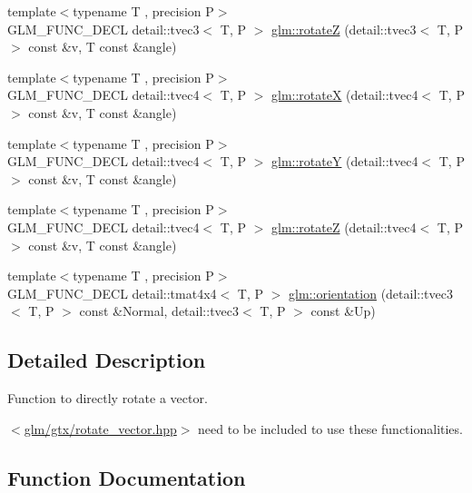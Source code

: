 \begin{DoxyCompactItemize}
\item 
{\footnotesize template$<$typename T , precision P$>$ }\\G\+L\+M\+\_\+\+F\+U\+N\+C\+\_\+\+D\+E\+CL detail\+::tvec3$<$ T, P $>$ \hyperlink{group__gtx__rotate__vector_gae5c27548f86f1e95f76a87cf16f512da}{glm\+::rotateZ} (detail\+::tvec3$<$ T, P $>$ const \&v, T const \&angle)
\item 
{\footnotesize template$<$typename T , precision P$>$ }\\G\+L\+M\+\_\+\+F\+U\+N\+C\+\_\+\+D\+E\+CL detail\+::tvec4$<$ T, P $>$ \hyperlink{group__gtx__rotate__vector_gaa0db2d8b73f86d7bfdf2bface4056e88}{glm\+::rotateX} (detail\+::tvec4$<$ T, P $>$ const \&v, T const \&angle)
\item 
{\footnotesize template$<$typename T , precision P$>$ }\\G\+L\+M\+\_\+\+F\+U\+N\+C\+\_\+\+D\+E\+CL detail\+::tvec4$<$ T, P $>$ \hyperlink{group__gtx__rotate__vector_gae48a26ac0e3670ad2486858bf2a8e90b}{glm\+::rotateY} (detail\+::tvec4$<$ T, P $>$ const \&v, T const \&angle)
\item 
{\footnotesize template$<$typename T , precision P$>$ }\\G\+L\+M\+\_\+\+F\+U\+N\+C\+\_\+\+D\+E\+CL detail\+::tvec4$<$ T, P $>$ \hyperlink{group__gtx__rotate__vector_ga1db5137be16ed5d375038e06707ac52b}{glm\+::rotateZ} (detail\+::tvec4$<$ T, P $>$ const \&v, T const \&angle)
\item 
{\footnotesize template$<$typename T , precision P$>$ }\\G\+L\+M\+\_\+\+F\+U\+N\+C\+\_\+\+D\+E\+CL detail\+::tmat4x4$<$ T, P $>$ \hyperlink{group__gtx__rotate__vector_gac80aaf3b2af70c7f03f1077d4b6ac507}{glm\+::orientation} (detail\+::tvec3$<$ T, P $>$ const \&Normal, detail\+::tvec3$<$ T, P $>$ const \&Up)
\end{DoxyCompactItemize}


\subsection{Detailed Description}
Function to directly rotate a vector. 

$<$\hyperlink{rotate__vector_8hpp}{glm/gtx/rotate\+\_\+vector.\+hpp}$>$ need to be included to use these functionalities. 

\subsection{Function Documentation}
